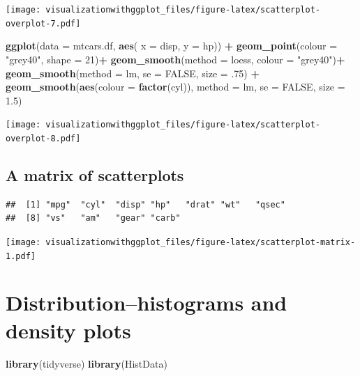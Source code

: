 \documentclass[]{krantz}
\makeatletter
\newenvironment{Shaded}{\begin{snugshade}}{\end{snugshade}}
\newcommand{\KeywordTok}[1]{\textcolor[rgb]{0.13,0.29,0.53}{\textbf{#1}}}
\newcommand{\DataTypeTok}[1]{\textcolor[rgb]{0.13,0.29,0.53}{#1}}
\newcommand{\DecValTok}[1]{\textcolor[rgb]{0.00,0.00,0.81}{#1}}
\newcommand{\FloatTok}[1]{\textcolor[rgb]{0.00,0.00,0.81}{#1}}
\newcommand{\StringTok}[1]{\textcolor[rgb]{0.31,0.60,0.02}{#1}}
\newcommand{\OtherTok}[1]{\textcolor[rgb]{0.56,0.35,0.01}{#1}}
\newcommand{\OperatorTok}[1]{\textcolor[rgb]{0.81,0.36,0.00}{\textbf{#1}}}
\newcommand{\NormalTok}[1]{#1}
\newenvironment{kframe}{%
\medskip{}
\setlength{\fboxsep}{.8em}
 \def\at@end@of@kframe{}%
 \ifinner\ifhmode%
  \def\at@end@of@kframe{\end{minipage}}%
  \begin{minipage}{\columnwidth}%
 \fi\fi%
 \def\FrameCommand##1{\hskip\@totalleftmargin \hskip-\fboxsep
 \colorbox{shadecolor}{##1}\hskip-\fboxsep
     \hskip-\linewidth \hskip-\@totalleftmargin \hskip\columnwidth}%
 \MakeFramed {\advance\hsize-\width
   \@totalleftmargin\z@ \linewidth\hsize
   \@setminipage}}%
 {\par\unskip\endMakeFramed%
 \at@end@of@kframe}
\renewenvironment{Shaded}{\begin{kframe}}{\end{kframe}}
\theoremstyle{definition}
\theoremstyle{definition}
\theoremstyle{definition}
\theoremstyle{remark}
\makeatother
\begin{document}
\texttt{[image: visualizationwithggplot\_files/figure-latex/scatterplot-overplot-7.pdf]}

\begin{Shaded}
\begin{Highlighting}[]
\KeywordTok{ggplot}\NormalTok{(}\DataTypeTok{data =}\NormalTok{ mtcars.df, }\KeywordTok{aes}\NormalTok{( }\DataTypeTok{x =}\NormalTok{ disp, }\DataTypeTok{y =}\NormalTok{ hp)) }\OperatorTok{+}
\StringTok{  }\KeywordTok{geom_point}\NormalTok{(}\DataTypeTok{colour =} \StringTok{"grey40"}\NormalTok{, }\DataTypeTok{shape =} \DecValTok{21}\NormalTok{)}\OperatorTok{+}
\StringTok{  }\KeywordTok{geom_smooth}\NormalTok{(}\DataTypeTok{method =}\NormalTok{ loess, }\DataTypeTok{colour =} \StringTok{"grey40"}\NormalTok{)}\OperatorTok{+}
\StringTok{  }\KeywordTok{geom_smooth}\NormalTok{(}\DataTypeTok{method =}\NormalTok{ lm, }\DataTypeTok{se =} \OtherTok{FALSE}\NormalTok{, }\DataTypeTok{size =}\NormalTok{ .}\DecValTok{75}\NormalTok{) }\OperatorTok{+}
\StringTok{    }\KeywordTok{geom_smooth}\NormalTok{(}\KeywordTok{aes}\NormalTok{(}\DataTypeTok{colour =} \KeywordTok{factor}\NormalTok{(cyl)), }
        \DataTypeTok{method =}\NormalTok{ lm, }\DataTypeTok{se =} \OtherTok{FALSE}\NormalTok{, }\DataTypeTok{size =} \FloatTok{1.5}\NormalTok{)}
\end{Highlighting}
\end{Shaded}

\texttt{[image: visualizationwithggplot\_files/figure-latex/scatterplot-overplot-8.pdf]}

\section{A matrix of scatterplots}\label{a-matrix-of-scatterplots}

\begin{verbatim}
##  [1] "mpg"  "cyl"  "disp" "hp"   "drat" "wt"   "qsec"
##  [8] "vs"   "am"   "gear" "carb"
\end{verbatim}

\texttt{[image: visualizationwithggplot\_files/figure-latex/scatterplot-matrix-1.pdf]}

\cleardoublepage 

\chapter{Distribution--histograms and density plots}\label{Distribution}

\begin{Shaded}
\begin{Highlighting}[]
\KeywordTok{library}\NormalTok{(tidyverse)}
\KeywordTok{library}\NormalTok{(HistData)}
\end{Highlighting}
\end{Shaded}
\end{document}
